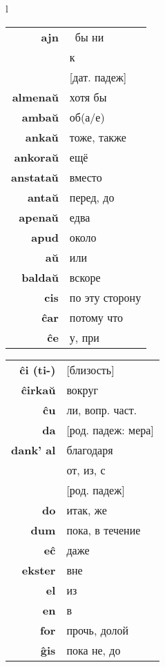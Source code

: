 \documentclass{article}
\begin{document}
\begin{center}
\begin{tabular}{l}
\begin{tabular}{>{\bfseries}rl}
ajn & \textellipsis~бы ни \\
\multirow{2}{*}{al} & к \\
& {}[дат. падеж] \\
almenaŭ & хотя бы \\
ambaŭ & об(а/е) \\
ankaŭ & тоже, также \\
ankoraŭ & ещё \\
anstataŭ & вместо \\
antaŭ & перед, до \\
apenaŭ & едва \\
apud & около \\
aŭ & или \\
baldaŭ & вскоре \\
cis & по эту сторону \\
ĉar & потому что \\
ĉe & у, при \\
\end{tabular}
\hspace{-3em}
\begin{tabular}{>{\bfseries}rl}
ĉi (ti-) & {}[близость] \\
ĉirkaŭ & вокруг \\
ĉu & ли, вопр. част. \\
da & {}[род. падеж: мера] \\
dank' al & благодаря \\
\multirow{2}{*}{de} & от, из, с \\
& {}[род. падеж] \\
do & итак, же \\
dum & пока, в течение \\
eĉ & даже \\
ekster & вне \\
el & из \\
en & в \\
for & прочь, долой \\
ĝis & пока не, до \\

\end{tabular}
\end{tabular}
\end{center}
\end{document}
